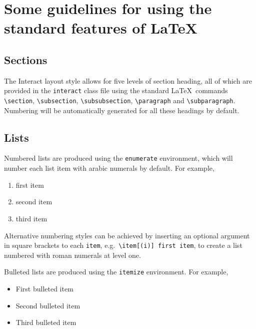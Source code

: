 \documentclass[]{interact}
\theoremstyle{plain}%
\theoremstyle{definition}
\theoremstyle{remark}
\def\tightlist{}
\begin{document}
\hypertarget{some-guidelines-for-using-the-standard-features-of}{%
\section{\texorpdfstring{Some guidelines for using the standard features
of
\LaTeX}{Some guidelines for using the standard features of }}\label{some-guidelines-for-using-the-standard-features-of}}

\hypertarget{sections}{%
\subsection{Sections}\label{sections}}

The \textsf{Interact} layout style allows for five levels of section
heading, all of which are provided in the \texttt{interact} class file
using the standard \LaTeX~commands \texttt{\textbackslash{}section},
\texttt{\textbackslash{}subsection},
\texttt{\textbackslash{}subsubsection},
\texttt{\textbackslash{}paragraph} and
\texttt{\textbackslash{}subparagraph}. Numbering will be automatically
generated for all these headings by default.

\hypertarget{lists}{%
\subsection{Lists}\label{lists}}

Numbered lists are produced using the \texttt{enumerate} environment,
which will number each list item with arabic numerals by default. For
example,

\begin{enumerate}
\def\labelenumi{\arabic{enumi}.}
\tightlist
\item
  first item
\item
  second item
\item
  third item
\end{enumerate}

Alternative numbering styles can be achieved by inserting an optional
argument in square brackets to each \texttt{item},
e.g.~\texttt{\textbackslash{}item{[}(i){]}\ first\ item}, to create a
list numbered with roman numerals at level one.

Bulleted lists are produced using the \texttt{itemize} environment. For
example,

\begin{itemize}
\tightlist
\item
  First bulleted item
\item
  Second bulleted item
\item
  Third bulleted item
\end{itemize}
\end{document}
